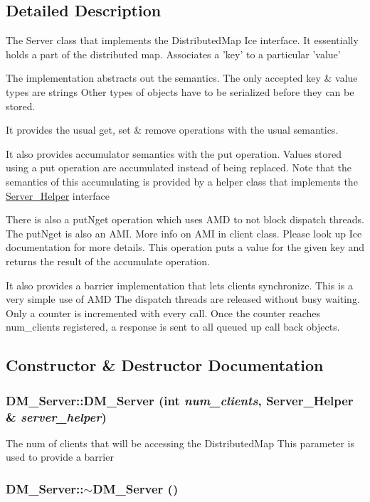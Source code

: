\subsection{Detailed Description}
The Server class that implements the DistributedMap Ice interface. It essentially holds a part of the distributed map. Associates a 'key' to a particular 'value'

The implementation abstracts out the semantics. The only accepted key \& value types are strings Other types of objects have to be serialized before they can be stored.

It provides the usual get, set \& remove operations with the usual semantics.

It also provides accumulator semantics with the put operation. Values stored using a put operation are accumulated instead of being replaced. Note that the semantics of this accumulating is provided by a helper class that implements the \hyperlink{class_server___helper}{Server\_\-Helper} interface

There is also a putNget operation which uses AMD to not block dispatch threads. The putNget is also an AMI. More info on AMI in client class. Please look up Ice documentation for more details. This operation puts a value for the given key and returns the result of the accumulate operation.

It also provides a barrier implementation that lets clients synchronize. This is a very simple use of AMD The dispatch threads are released without busy waiting. Only a counter is incremented with every call. Once the counter reaches num\_\-clients registered, a response is sent to all queued up call back objects. 

\subsection{Constructor \& Destructor Documentation}
\hypertarget{class_d_m___server_a1cd634944614b427c01095814f91e8e4}{
\subsubsection[{DM\_\-Server}]{\setlength{\rightskip}{0pt plus 5cm}DM\_\-Server::DM\_\-Server (int {\em num\_\-clients}, \/  {\bf Server\_\-Helper} \& {\em server\_\-helper})}}
\label{class_d_m___server_a1cd634944614b427c01095814f91e8e4}
The num of clients that will be accessing the DistributedMap This parameter is used to provide a barrier \hypertarget{class_d_m___server_a5ca03ed605fe2eeabfc0e86b8d9348e5}{
\subsubsection[{$\sim$DM\_\-Server}]{\setlength{\rightskip}{0pt plus 5cm}DM\_\-Server::$\sim$DM\_\-Server ()}}
\label{class_d_m___server_a5ca03ed605fe2eeabfc0e86b8d9348e5}


